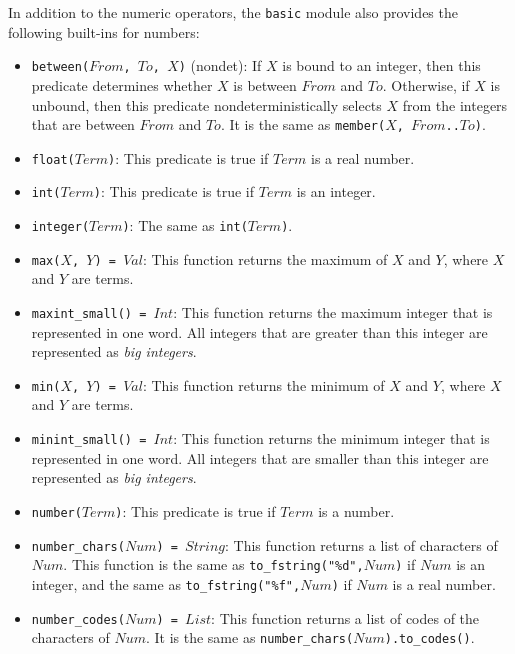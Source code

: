 In addition to the numeric operators, the \texttt{basic} module also provides the following built-ins for numbers:

\begin{itemize}
\item \texttt{between($From$, $To$, $X$)} (nondet): If $X$ is bound to an integer, then this predicate determines whether $X$ is between $From$ and $To$.  Otherwise, if $X$ is unbound, then this predicate nondeterministically selects $X$ from the integers that are between $From$ and $To$. It is the same as \texttt{member($X$, $From$..$To$)}.
\item \texttt{float($Term$)}: This predicate is true if $Term$ is a real number.
\item \texttt{int($Term$)}: This predicate is true if $Term$ is an integer.
\item \texttt{integer($Term$)}: The same as \texttt{int($Term$)}.
\item \texttt{max($X$, $Y$) = $Val$}: This function returns the maximum of $X$ and $Y$, where $X$ and $Y$ are terms.
\item \texttt{maxint\_small() = $Int$}: This function returns the maximum integer that is represented in one word. All integers that are greater than this integer are represented as \textit{big integers}.
\item \texttt{min($X$, $Y$) = $Val$}: This function returns the minimum of $X$ and $Y$, where $X$ and $Y$ are terms.
\item \texttt{minint\_small() = $Int$}: This function returns the minimum integer that is represented in one word. All integers that are smaller than this integer are represented as \textit{big integers}.
\item \texttt{number($Term$)}: This predicate is true if $Term$ is a number.
\item \texttt{number\_chars($Num$) = $String$}: This function returns a list of characters of $Num$. This function is the same as \texttt{to\_fstring("\%d",$Num$)} if $Num$ is an integer, and the same as \texttt{to\_fstring("\%f",$Num$)} if $Num$ is a real number.
\item \texttt{number\_codes($Num$) = $List$}: This function returns a list of codes of the characters of $Num$. It is the same as \texttt{number\_chars($Num$).to\_codes()}.

\end{itemize}
